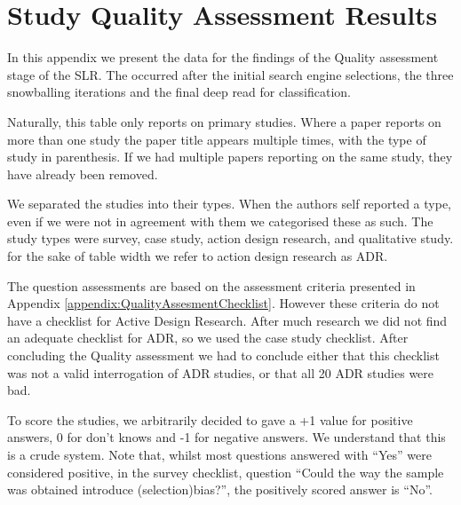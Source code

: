 \chapter{Study Quality Assessment Results} 
\label{appendix:Quality_Assessment_Results} 

In this appendix we present the data for the findings of the Quality assessment stage of the SLR.
The occurred after the initial search engine selections, the three snowballing iterations and the final deep read for classification.

Naturally, this table only reports on primary studies.
Where a paper reports on more than one study the paper title appears multiple times, with the type of study in parenthesis.
If we had multiple papers reporting on the same study, they have already been removed.

We separated the studies into their types.
When the authors self reported a type, even if we were not in agreement with them we categorised these as such.
The study types were survey, case study, action design research, and qualitative study.
for the sake of table width we refer to action design research as ADR.

The question assessments are based on the assessment criteria presented in Appendix \ref{appendix:QualityAssesmentChecklist}.
However these criteria do not have a checklist for Active Design Research.
After much research we did not find an adequate checklist for ADR, so we used the case study checklist.
After concluding the Quality assessment we had to conclude either that this checklist was not a valid interrogation of ADR studies, or that all 20 ADR studies were bad.

To score the studies, we arbitrarily decided to gave a +1 value for positive answers, 0 for don't knows and -1 for negative answers.
We understand that this is a crude system.
Note that, whilst most questions answered with ``Yes'' were considered positive, in the survey checklist, question ``Could the way the sample was obtained introduce (selection)bias?'', the positively scored answer is ``No''.

